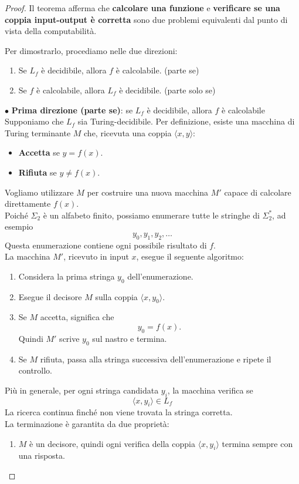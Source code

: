 \begin{proof}
    Il teorema afferma che \textbf{calcolare una funzione}
e \textbf{verificare se una coppia input-output è corretta}
sono due problemi equivalenti dal punto di vista della computabilità.

\noindent Per dimostrarlo, procediamo nelle due direzioni:
\begin{enumerate}
    \item Se $L_f$ è decidibile, allora $f$ è calcolabile. (parte se)
    \item Se $f$ è calcolabile, allora $L_f$ è decidibile. (parte solo se)
\end{enumerate}

   \noindent $\bullet$ \textbf{Prima direzione (parte se)}: se $L_f$ è decidibile, allora $f$ è calcolabile \smallskip\\
Supponiamo che $L_f$ sia Turing-decidibile. Per definizione, esiste una macchina di Turing terminante $M$
che, ricevuta una coppia $\langle x,y\rangle$:
\begin{itemize}[label = --]
    \item \textbf{Accetta} se $y=f(x)$.
    \item \textbf{Rifiuta} se $y\neq f(x)$.
\end{itemize}
Vogliamo utilizzare $M$ per costruire una nuova macchina
$M'$ capace di calcolare direttamente $f(x)$.\\
Poiché $\Sigma_2$ è un alfabeto finito, possiamo
enumerare tutte le stringhe di $\Sigma_2^*$, ad esempio
\[ y_0,y_1,y_2,\ldots \]
Questa enumerazione contiene ogni possibile risultato di $f$.\\
La macchina $M'$, ricevuto in input $x$, esegue il seguente algoritmo:
\begin{enumerate}
    \item Considera la prima stringa $y_0$
    dell'enumerazione.

    \item Esegue il decisore $M$ sulla coppia
    $\langle x,y_0\rangle$.

    \item Se $M$ accetta, significa che
    \[
    y_0=f(x).
    \]
    Quindi $M'$ scrive $y_0$ sul nastro e termina.

    \item Se $M$ rifiuta, passa alla stringa successiva
    dell'enumerazione e ripete il controllo.
\end{enumerate}
Più in generale, per ogni stringa candidata $y_i$, la macchina verifica se
\[ \langle x,y_i\rangle\in L_f\]
La ricerca continua finché non viene trovata la stringa corretta.\\
La terminazione è garantita da due proprietà:
\begin{enumerate}
    \item $M$ è un decisore, quindi ogni verifica
    della coppia $\langle x,y_i\rangle$ termina
    sempre con una risposta.


\end{enumerate}
\end{proof}
